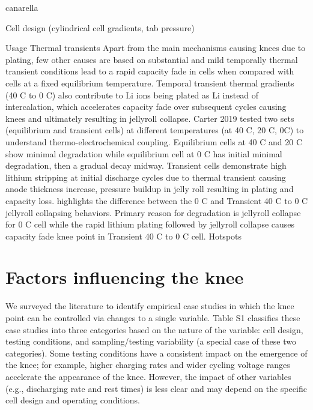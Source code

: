 \documentclass[journal=jpclcd,manuscript=article]{achemso}
\newcommand{\pbox}[1]{{
\fbox{
\parbox{0.8\textwidth}{  \fbox{$\triangleright$\textcolor{blue}{\textbf{Peter}:}} 
#1
}}}}
\begin{document}
canarella \cite{cannarella_stress_2014}

\cite{liu_size_2018, okasinski_situ_2020}
Cell design (cylindrical cell gradients, tab pressure)

Usage
Thermal transients \cite{carter_detection_2019}
Apart from the main mechanisms causing knees due to plating, few other causes are based on substantial and mild temporally thermal transient conditions lead to a rapid capacity fade in cells when compared with cells at a fixed equilibrium temperature. Temporal transient thermal gradients (40 \degree C to 0 \degree C) also contribute to Li ions being plated as Li instead of intercalation, which accelerates capacity fade over subsequent cycles causing knees and ultimately resulting in jellyroll collapse. Carter 2019 tested two sets (equilibrium and transient cells) at different temperatures (at 40 \degree C, 20 \degree C, 0\degree C) to understand thermo-electrochemical coupling. Equilibrium cells at 40 \degree C and 20 \degree C show minimal degradation while equilibrium cell at 0 \degree C has initial minimal degradation, then a gradual decay midway. Transient cells demonstrate high lithium stripping at initial discharge cycles due to thermal transient causing anode thickness increase, pressure buildup in jelly roll resulting in plating and capacity loss.   highlights the difference between the 0 \degree C and Transient 40 \degree C to 0 \degree C jellyroll collapsing behaviors. Primary reason for degradation is jellyroll collapse for 0 \degree C cell while the rapid lithium plating followed by jellyroll collapse causes capacity fade knee point in Transient 40 \degree C to 0 \degree C cell.         
Hotspots

\section{Factors influencing the knee}

\pbox{I haven't edited this yet}

We surveyed the literature to identify empirical case studies in which the knee point can be controlled via changes to a single variable. Table S1 classifies these case studies into three categories based on the nature of the variable: cell design, testing conditions, and sampling/testing variability (a special case of these two categories). Some testing conditions have a consistent impact on the emergence of the knee; for example, higher charging rates and wider cycling voltage ranges accelerate the appearance of the knee. However, the impact of other variables (e.g., discharging rate and rest times) is less clear and may depend on the specific cell design and operating conditions.
\end{document}
